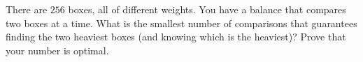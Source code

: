 There are $256$ boxes, all of different weights. You have a balance that compares two boxes at a time. What is the smallest number of comparisons that guarantees finding the two heaviest boxes (and knowing which is the heaviest)? Prove that your number is optimal.

